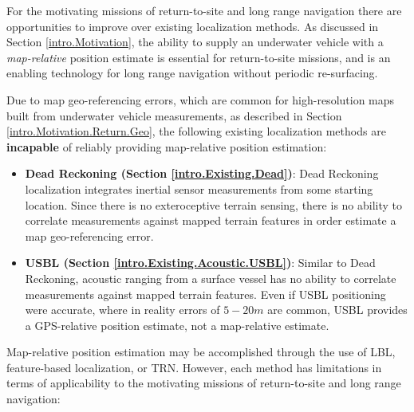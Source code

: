 For the motivating missions of return-to-site and long range navigation there are opportunities to improve over existing localization methods.
As discussed in Section \ref{intro.Motivation}, the ability to supply an underwater vehicle with a \emph{map-relative} position estimate is essential for return-to-site missions, and is an enabling technology for long range navigation without periodic re-surfacing.

Due to map geo-referencing errors, which are common for high-resolution maps built from underwater vehicle measurements, as described in Section \ref{intro.Motivation.Return.Geo}, the following existing localization methods are \textbf{incapable} of reliably providing map-relative position estimation:

\begin{itemize}
\item \textbf{Dead Reckoning (Section \ref{intro.Existing.Dead})}: Dead Reckoning localization integrates inertial sensor measurements from some starting location. 
Since there is no exteroceptive terrain sensing, there is no ability to correlate measurements against mapped terrain features in order estimate a map geo-referencing error.
\item \textbf{USBL (Section \ref{intro.Existing.Acoustic.USBL})}: Similar to Dead Reckoning, acoustic ranging from a surface vessel has no ability to correlate measurements against mapped terrain features. Even if USBL positioning were accurate, where in reality errors of $5-20m$ are common, USBL provides a GPS-relative position estimate, not a map-relative estimate.
\end{itemize}

Map-relative position estimation may be accomplished through the use of LBL, feature-based localization, or TRN.
However, each method has limitations in terms of applicability to the motivating missions of return-to-site and long range navigation:

